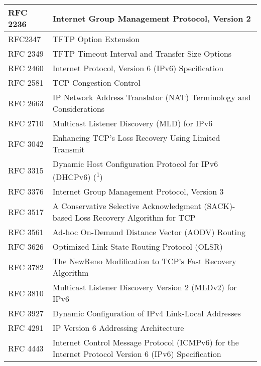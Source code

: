 \begin{longtable}{ | l | p{15cm} | }
RFC 2236 &
Internet Group Management Protocol, Version 2 \\ \hline

RFC2347 &
TFTP Option Extension \\ \hline

RFC 2349 &
TFTP Timeout Interval and Transfer Size Options \\ \hline

RFC 2460 &
Internet Protocol, Version 6 (IPv6) Specification \\ \hline

RFC 2581 &
TCP Congestion Control \\ \hline

RFC 2663 &
IP Network Address Translator (NAT) Terminology and Considerations \\ \hline

RFC 2710 &
Multicast Listener Discovery (MLD) for IPv6 \\ \hline

RFC 3042 &
Enhancing TCP's Loss Recovery Using Limited Transmit \\ \hline

RFC 3315 &
Dynamic Host Configuration Protocol for IPv6 (DHCPv6) (\textsuperscript{1}) \\ \hline

RFC 3376 &
Internet Group Management Protocol, Version 3 \\ \hline

RFC 3517 &
A Conservative Selective Acknowledgment (SACK)-based Loss Recovery Algorithm for TCP \\ \hline

RFC 3561 &
Ad-hoc On-Demand Distance Vector (AODV) Routing \\ \hline

RFC 3626 &
Optimized Link State Routing Protocol (OLSR) \\ \hline

RFC 3782 &
The NewReno Modification to TCP's Fast Recovery Algorithm \\ \hline

RFC 3810 &
Multicast Listener Discovery Version 2 (MLDv2) for IPv6 \\ \hline

RFC 3927 &
Dynamic Configuration of IPv4 Link-Local Addresses \\ \hline

RFC 4291 &
IP Version 6 Addressing Architecture \\ \hline

RFC 4443 &
Internet Control Message Protocol (ICMPv6) for the Internet Protocol Version 6 (IPv6) Specification \\ \hline


\end{longtable}
